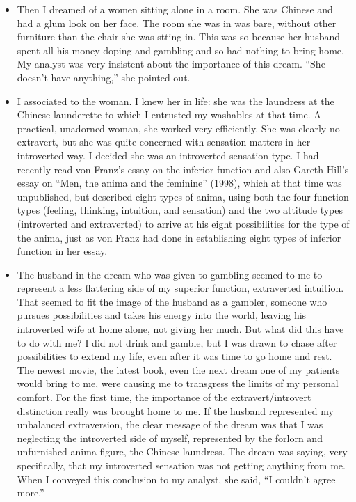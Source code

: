 \begin{itemize}
\item Then I dreamed of a women sitting alone in a room. She was Chinese and
had a glum look on her face. The room she was in was bare, without other
furniture than the chair she was stting in. This was so because her husband
spent all his money doping and gambling and so had nothing to bring home. My
analyst was very insistent about the importance of this dream. ``She doesn't
have anything,'' she pointed out.

\item I associated to the woman. I knew her in life: she was the laundress at
the Chinese launderette to which I entrusted my washables at that time. A
practical, unadorned woman, she worked very efficiently. She was clearly no
extravert, but she was quite concerned with sensation matters in her
introverted way.  I decided she was an introverted sensation type. I had
recently read von Franz's essay on the inferior function and also Gareth Hill's
essay on ``Men, the anima and the feminine'' (1998), which at that time was
unpublished, but described eight types of anima, using both the four function
types (feeling, thinking, intuition, and sensation) and the two attitude types
(introverted and extraverted) to arrive at his eight possibilities for the type
of the anima, just as von Franz had done in establishing eight types of
inferior function in her essay.

\item The husband in the dream who was given to gambling seemed to me to
represent a less flattering side of my superior function, extraverted
intuition. That seemed to fit the image of the husband as a gambler, someone
who pursues possibilities and takes his energy into the world, leaving his
introverted wife at home alone, not giving her much. But what did this have to
do with me? I did not drink and gamble, but I was drawn to chase after
possibilities to extend my life, even after it was time to go home and rest.
The newest movie, the latest book, even the next dream one of my patients would
bring to me, were causing me to transgress the limits of my personal comfort.
For the first time, the importance of the extravert/introvert distinction
really was brought home to me. If the husband represented my unbalanced
extraversion, the clear message of the dream was that I was neglecting the
introverted side of myself, represented by the forlorn and unfurnished anima
figure, the Chinese laundress. The dream was saying, very specifically, that my
introverted sensation was not getting anything from me. When I conveyed this
conclusion to my analyst, she said, ``I couldn't agree more.''


\end{itemize}
